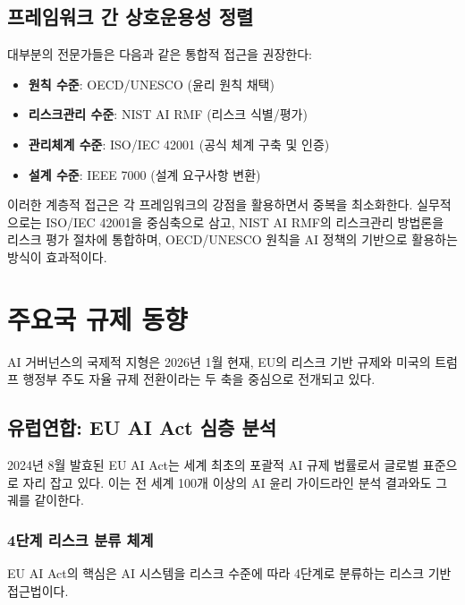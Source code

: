 \subsection{프레임워크 간 상호운용성 정렬}
대부분의 전문가들은 다음과 같은 통합적 접근을 권장한다:
\begin{itemize}
 \item \textbf{원칙 수준}: OECD/UNESCO (윤리 원칙 채택)
 \item \textbf{리스크관리 수준}: NIST AI RMF (리스크 식별/평가)
 \item \textbf{관리체계 수준}: ISO/IEC 42001 (공식 체계 구축 및 인증)
 \item \textbf{설계 수준}: IEEE 7000 (설계 요구사항 변환)
\end{itemize}

이러한 계층적 접근은 각 프레임워크의 강점을 활용하면서 중복을 최소화한다. 실무적으로는 ISO/IEC 42001을 중심축으로 삼고, NIST AI RMF의 리스크관리 방법론을 리스크 평가 절차에 통합하며, OECD/UNESCO 원칙을 AI 정책의 기반으로 활용하는 방식이 효과적이다.

\section{주요국 규제 동향}
AI 거버넌스의 국제적 지형은 2026년 1월 현재, EU의 리스크 기반 규제와 미국의 트럼프 행정부 주도 자율 규제 전환이라는 두 축을 중심으로 전개되고 있다.\cite{smuha2021race, bradford2020brussels}

\subsection{유럽연합: EU AI Act 심층 분석}
2024년 8월 발효된 EU AI Act는 세계 최초의 포괄적 AI 규제 법률로서 글로벌 표준으로 자리 잡고 있다.\cite{eu2024aiact} 이는 전 세계 100개 이상의 AI 윤리 가이드라인 분석 결과와도 그 궤를 같이한다.\cite{jobin2019global}

\subsubsection{4단계 리스크 분류 체계}

EU AI Act의 핵심은 AI 시스템을 리스크 수준에 따라 4단계로 분류하는 리스크 기반 접근법이다.

